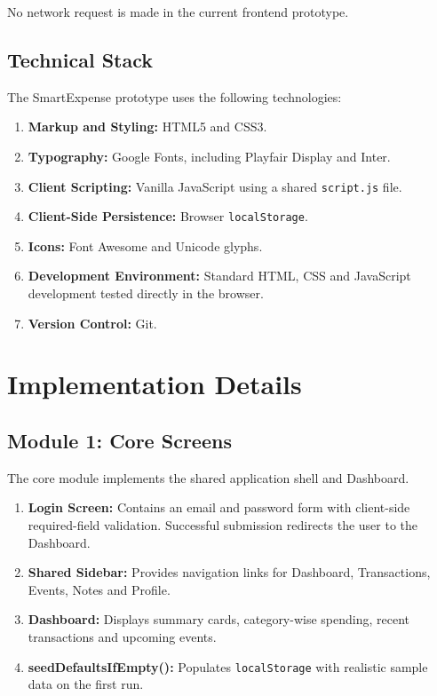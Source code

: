 \documentclass[12pt,a4paper]{report}
\begin{document}
No network request is made in the current frontend prototype.

\subsection{Technical Stack}

The SmartExpense prototype uses the following technologies:

\begin{enumerate}
    \item \textbf{Markup and Styling:} HTML5 and CSS3.
    \item \textbf{Typography:} Google Fonts, including Playfair Display and Inter.
    \item \textbf{Client Scripting:} Vanilla JavaScript using a shared
    \texttt{script.js} file.
    \item \textbf{Client-Side Persistence:} Browser \texttt{localStorage}.
    \item \textbf{Icons:} Font Awesome and Unicode glyphs.
    \item \textbf{Development Environment:} Standard HTML, CSS and JavaScript
    development tested directly in the browser.
    \item \textbf{Version Control:} Git.
\end{enumerate}


\section{Implementation Details}

\subsection{Module 1: Core Screens}

The core module implements the shared application shell and Dashboard.

\begin{enumerate}
    \item \textbf{Login Screen:} Contains an email and password form with
    client-side required-field validation. Successful submission redirects
    the user to the Dashboard.

    \item \textbf{Shared Sidebar:} Provides navigation links for Dashboard,
    Transactions, Events, Notes and Profile.

    \item \textbf{Dashboard:} Displays summary cards, category-wise spending,
    recent transactions and upcoming events.

    \item \textbf{seedDefaultsIfEmpty():} Populates \texttt{localStorage}
    with realistic sample data on the first run.
\end{enumerate}
\end{document}

